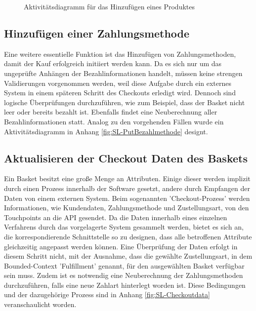 \begin{figure}[H]
	\centering
	
	\caption{Aktivitätsdiagramm für das Hinzufügen eines Produktes }
	\label{fig:SL-AddProduct}
\end{figure}

\subsection{Hinzufügen einer Zahlungsmethode}

Eine weitere essentielle Funktion ist das Hinzufügen von Zahlungsmethoden, damit der Kauf erfolgreich initiiert werden kann. Da es sich nur um das ungeprüfte Anhängen der Bezahlinformationen handelt, müssen keine strengen Validierungen vorgenommen werden, weil diese Aufgabe durch ein externes System in einem späteren Schritt des Checkouts erledigt wird. Dennoch sind logische Überprüfungen durchzuführen, wie zum Beispiel, dass der Basket nicht leer oder bereits bezahlt ist. Ebenfalls findet eine Neuberechnung aller Bezahlinformationen statt. Analog zu den vorgehenden Fällen wurde ein Aktivitätsdiagramm in Anhang \ref{fig:SL-PutBezahlmethode} designt.

\pagebreak

\subsection{Aktualisieren der Checkout Daten des Baskets}

Ein Basket besitzt eine große Menge an Attributen. Einige dieser werden implizit durch einen Prozess innerhalb der Software gesetzt, andere durch Empfangen der Daten von einem externen System. Beim sogenannten 'Checkout-Prozess' werden Informationen, wie Kundendaten, Zahlungsmethode und Zustellungsart, von den Touchpoints an die API gesendet. Da die Daten innerhalb eines einzelnen Verfahrens durch das vorgelagerte System gesammelt werden, bietet es sich an, die korrespondierende Schnittstelle so zu designen, dass alle betroffenen Attribute gleichzeitig angepasst werden können. Eine Überprüfung der Daten erfolgt in diesem Schritt nicht, mit der Ausnahme, dass die gewählte Zustellungsart, in dem Bounded-Context 'Fulfillment' genannt, für den ausgewählten Basket verfügbar sein muss. Zudem ist es notwendig eine Neuberechnung der Zahlungsmethoden durchzuführen, falls eine neue Zahlart hinterlegt worden ist. Diese Bedingungen und der dazugehörige Prozess sind in Anhang \ref{fig:SL-Checkoutdata} veranschaulicht worden.


